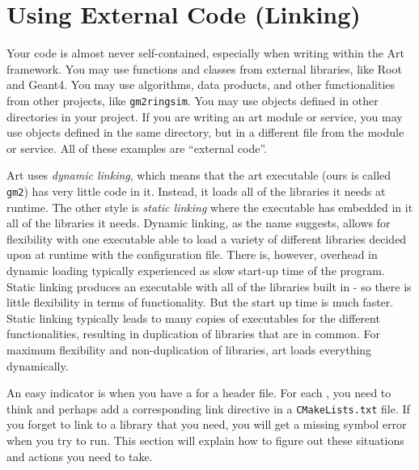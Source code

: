 \section{Using External Code (Linking)}
\label{sec:usingExternal}

Your code is almost never self-contained, especially when writing
within the Art framework. You may use functions and classes from
external libraries, like Root and Geant4. You may use algorithms, data
products, and other functionalities from other projects, like
\texttt{gm2ringsim}. You may use objects defined in other directories
in your project. If you are writing an art module or service, you may
use objects defined in the same directory, but in a different file
from the module or service.  All of these examples are ``external
code''.

Art uses \emph{dynamic linking}, which means that the art executable (ours is called \texttt{gm2}) has very little code in it. Instead, it loads all of the libraries it needs at runtime. The other style is \emph{static linking} where the executable has embedded in it all of the libraries it needs. Dynamic linking, as the name suggests, allows for flexibility with one executable able to load a variety of different  libraries decided upon at runtime with the configuration file. There is, however, overhead in dynamic loading typically experienced as slow start-up time of the program. Static linking produces an executable with all of the libraries built in - so there is little flexibility in terms of functionality. But the start up time is much faster. Static linking typically leads to many copies of executables for the different functionalities, resulting in duplication of libraries that are in common. For maximum flexibility and non-duplication of libraries, art loads everything dynamically. 

 An easy
indicator is when you have a  for a header file. For
each , you need to think and perhaps add a
corresponding link directive in a \texttt{CMakeLists.txt}
file.  If you forget to link to a library that you need, you will
get a missing symbol error when you try to run. This section will
explain how to figure out these situations and actions you need to
take.

